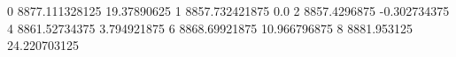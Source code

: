 0 8877.111328125 19.37890625
1 8857.732421875 0.0
2 8857.4296875 -0.302734375
4 8861.52734375 3.794921875
6 8868.69921875 10.966796875
8 8881.953125 24.220703125

